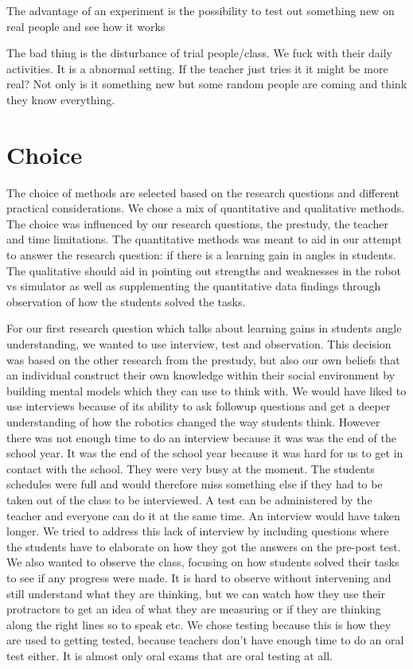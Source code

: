 \bigskip\noindent
The advantage of an experiment is the possibility  to test out something new on real people and see how it works

\bigskip\noindent
The bad thing is the disturbance of trial people/class. We fuck with their daily activities. It is a abnormal setting. If the teacher just tries it it might be more real? Not only is it something new but some random people are coming and think they know everything. 
\section{Choice}
The choice of methods are selected based on the research questions and different practical considerations. We chose a mix of quantitative and qualitative methods. The choice was influenced by our research questions, the prestudy, the teacher and time limitations. The quantitative methods was meant to aid in our attempt to answer the research question: if there is a learning gain in angles in students. The qualitative should aid in pointing out strengths and weaknesses in the robot vs simulator as well as supplementing the quantitative data findings through observation of how the students solved the tasks. 

\bigskip\noindent
For our first research question which talks about learning gains in students angle understanding, we wanted to use interview, test and observation. This decision was based on the other research from the prestudy, but also our own beliefs that an individual construct their own knowledge within their social environment by building mental models which they can use to think with. We would have liked to use interviews because of its ability to ask followup questions and get a deeper understanding of how the robotics changed the way students think. However there was not enough time to do an interview because it was was the end of the school year. It was the end of the school year because it was hard for us to get in contact with the school. They were very busy at the moment. The students schedules were full and would therefore miss something else if they had to be taken out of the class to be interviewed. A test can be administered by the teacher and everyone can do it at the same time. An interview would have taken longer. We tried to address this lack of interview by including questions where the students have to elaborate on how they got the answers on the pre-post test. We also wanted to observe the class, focusing on how students solved their tasks to see if any progress were made. It is hard to observe without intervening and still understand what they are thinking, but we can watch how they use their protractors to get an idea of what they are measuring or if they are thinking along the right lines so to speak etc. We chose testing because this is how they are used to getting tested, because teachers don't have enough time to do an oral test either. It is almost only oral exams that are oral testing at all. 

